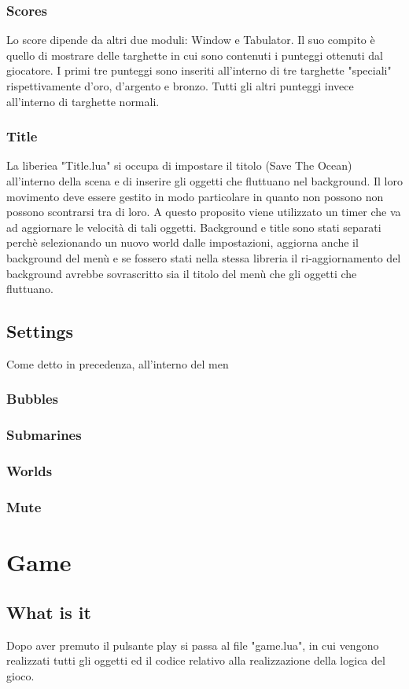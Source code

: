 \documentclass[15pt]{article}
\begin{document}
\subsubsection{Scores}
Lo score dipende da altri due moduli: Window e Tabulator. Il suo compito è quello di mostrare delle targhette in cui sono contenuti i punteggi ottenuti dal giocatore. I primi tre punteggi sono inseriti all'interno di tre targhette "speciali" rispettivamente d'oro, d'argento e bronzo. Tutti gli altri punteggi invece all'interno di targhette normali. 
\subsubsection{Title}
La liberiea "Title.lua" si occupa di impostare il titolo (Save The Ocean) all'interno della scena e di inserire gli oggetti che fluttuano nel background. Il loro movimento deve essere gestito in modo particolare in quanto non possono non possono scontrarsi tra di loro. A questo proposito viene utilizzato un timer che va ad aggiornare le velocità di tali oggetti. Background e title sono stati separati perchè selezionando un nuovo world dalle impostazioni, aggiorna anche il background del menù e se fossero stati nella stessa libreria il ri-aggiornamento del background avrebbe sovrascritto sia il titolo del menù che gli oggetti che fluttuano.
\subsection{Settings}
Come detto in precedenza, all'interno del men
\subsubsection{Bubbles}
\subsubsection{Submarines}
\subsubsection{Worlds}
\subsubsection{Mute}

\section{Game}
\subsection{What is it}
Dopo aver premuto il pulsante play si passa al file "game.lua", in cui vengono realizzati tutti gli oggetti ed il codice relativo 
alla realizzazione della logica del gioco.
\end{document}
